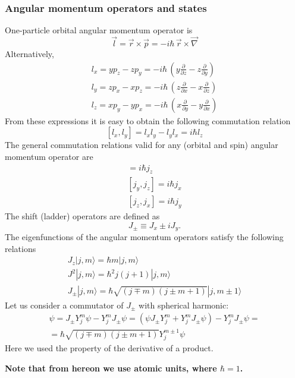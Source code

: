 \documentclass[a4paper,oneside,12pt]{extarticle}
\begin{document}
\subsubsection {Angular momentum operators and states}
%
One-particle orbital angular momentum operator is
$$
\vec{l} = \vec{r} \times \vec{p} = -i\hbar\, \vec{r} \times \vec{\nabla}
$$
Alternatively,
\begin{align}
l_x = y p_z - z p_y = -i\hbar\, \left(y \frac{\partial}{\partial z} - z \frac{\partial}{\partial y} \right) \\
l_y = z p_x - x p_z = -i\hbar\, \left(z \frac{\partial}{\partial x} - x \frac{\partial}{\partial z} \right) \\
l_z = x p_y - y p_x = -i\hbar\, \left(x \frac{\partial}{\partial y} - y \frac{\partial}{\partial x} \right)
\end{align}
%
From these expressions it is easy to obtain the following commutation relation
%
$$
[l_x, l_y] = l_x l_y - l_y l_x = i \hbar l_z
$$
The general commutation relations valid for any (orbital and spin) angular momentum operator are
\begin{align}
[j_x, j_y] = i \hbar j_z \\
[j_y, j_z] = i \hbar j_x \\
[j_z, j_x] = i \hbar j_y
\end{align}
%
The shift (ladder) operators are defined as
$$
J_{\pm}\equiv J_x \pm i J_y.
$$
%
The eigenfunctions of the angular momentum operators satisfy the following relations
\begin{align}
J_z | j,m\rangle = \hbar m | j,m\rangle \\
J^2 | j,m\rangle = \hbar^2 j(j+1) | j,m\rangle \\
J_{\pm} | j,m\rangle = \hbar \sqrt{(j\mp m)(j \pm m + 1)} | j,m\pm 1\rangle
\end{align}
%
Let us consider a commutator of $J_{\pm}$ with spherical harmonic:
\begin{multline}
[J_{\pm},Y_j^m] \psi = J_{\pm} Y_j^m \psi - Y_j^m J_{\pm} \psi = 
\left(\psi J_{\pm} Y_j^m + Y_j^m J_{\pm} \psi \right) - Y_j^m J_{\pm} \psi = \\ =
\hbar \sqrt{(j\mp m)(j \pm m + 1)} Y_j^{m\pm 1} \psi
\end{multline}
%
Here we used the property of the derivative of a product.

{\bf Note that from hereon we use atomic units, where $\hbar=1$.}

\end{document}
